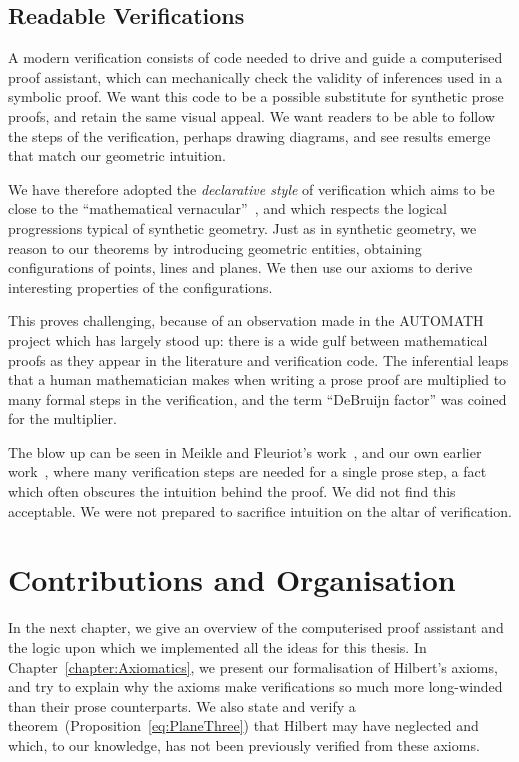 \subsection{Readable Verifications}
A modern verification consists of code needed to drive and guide a computerised proof assistant, which can mechanically check the validity of inferences used in a symbolic proof. We want this code to be a possible substitute for synthetic prose proofs, and retain the same visual appeal. We want readers to be able to follow the steps of the verification, perhaps drawing diagrams, and see results emerge that match our geometric intuition.

We have therefore adopted the \emph{declarative style} of verification which aims to be close to the ``mathematical vernacular''~\cite{MizarMathematicalVernacular}, and which respects the logical progressions typical of synthetic geometry. Just as in synthetic geometry, we reason to our theorems by introducing geometric entities, obtaining configurations of points, lines and planes. We then use our axioms to derive interesting properties of the configurations.

This proves challenging, because of an observation made in the AUTOMATH project which has largely stood up: there is a wide gulf between mathematical proofs as they appear in the literature and verification code. The inferential leaps that a human mathematician makes when writing a prose proof are multiplied to many formal steps in the verification, and the term ``DeBruijn factor'' was coined for the multiplier. 

The blow up can be seen in Meikle and Fleuriot's work~\cite{MeikleFleuriotFormalizingHilbert}, and our own earlier work~\cite{ScottMScThesis}, where many verification steps are needed for a single prose step, a fact which often obscures the intuition behind the proof. We did not find this acceptable. We were not prepared to sacrifice intuition on the altar of verification.

\section{Contributions and Organisation}
In the next chapter, we give an overview of the computerised proof assistant and the logic upon which we implemented all the ideas for this thesis. In Chapter~\ref{chapter:Axiomatics}, we present our formalisation of Hilbert's axioms, and try to explain why the axioms make verifications so much more long-winded than their prose counterparts. We also state and verify a theorem~(Proposition~\ref{eq:PlaneThree}) that Hilbert may have neglected and which, to our knowledge, has not been previously verified from these axioms.

